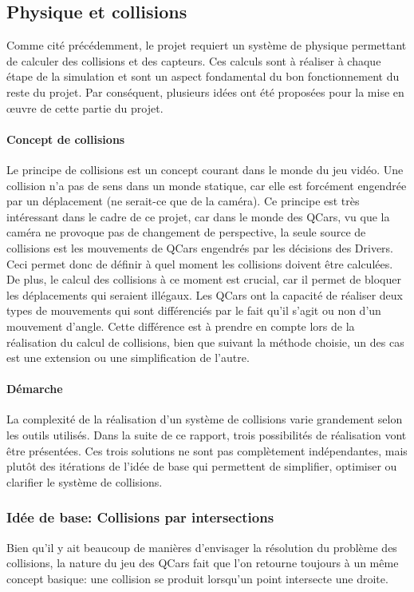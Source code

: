 \documentclass[a4paper, 12pt]{article}
\begin{document}
\subsection{Physique et collisions}
Comme cité précédemment, le projet requiert un système de physique permettant de calculer des collisions et des capteurs. Ces calculs sont à réaliser à chaque étape de la simulation et sont un aspect fondamental du bon fonctionnement du reste du projet. Par conséquent, plusieurs idées ont été proposées pour la mise en œuvre de cette partie du projet.
\paragraph{Concept de collisions}
Le principe de collisions est un concept courant dans le monde du jeu vidéo. Une collision n'a pas de sens dans un monde statique, car elle est forcément engendrée par un déplacement (ne serait-ce que de la caméra). Ce principe est très intéressant dans le cadre de ce projet, car dans le monde des QCars, vu que la caméra ne provoque pas de changement de perspective, la seule source de collisions est les mouvements de QCars engendrés par les décisions des Drivers. Ceci permet donc de définir à quel moment les collisions doivent être calculées. De plus, le calcul des collisions à ce moment est crucial, car il permet de bloquer les déplacements qui seraient illégaux. Les QCars ont la capacité de réaliser deux types de mouvements qui sont différenciés par le fait qu'il s'agit ou non d'un mouvement d'angle. Cette différence est à prendre en compte lors de la réalisation du calcul de collisions, bien que suivant la méthode choisie, un des cas est une extension ou une simplification de l'autre.
\paragraph{Démarche}
La complexité de la réalisation d'un système de collisions varie grandement selon les outils utilisés. Dans la suite de ce rapport, trois possibilités de réalisation vont être présentées. Ces trois solutions ne sont pas complètement indépendantes, mais plutôt des itérations de l'idée de base qui permettent de simplifier, optimiser ou clarifier le système de collisions.
\subsubsection{Idée de base: Collisions par intersections}
Bien qu'il y ait beaucoup de manières d'envisager la résolution du problème des collisions, la nature du jeu des QCars fait que l'on retourne toujours à un même concept basique: une collision se produit lorsqu'un point intersecte une droite. 
\end{document}
